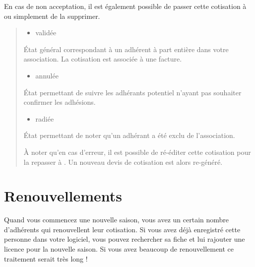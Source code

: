 \documentclass[a4paper,10pt,oneside,french]{sphinxmanual}
\begin{document}
En cas de non acceptation, il est également possible de passer cette cotisation à  ou simplement de la supprimer.
\begin{quote}
\begin{itemize}
\item {} 
validée

\end{itemize}

État général correspondant à un adhérent à part entière dans votre association.
La cotisation est associée à une facture.
\begin{itemize}
\item {} 
annulée

\end{itemize}

État permettant de suivre les adhérants potentiel n’ayant pas souhaiter confirmer les adhésions.
\begin{itemize}
\item {} 
radiée

\end{itemize}

État permettant de noter qu’un adhérant a été exclu de l’association.

À noter qu’en cas d’erreur, il est possible de ré-éditer cette cotisation pour la repasser à .
Un nouveau devis de cotisation est alors re-généré.
\end{quote}


\section{Renouvellements}
\label{\detokenize{member/renew:renouvellements}}\label{\detokenize{member/renew::doc}}
Quand vous commencez une nouvelle saison, vous avez un certain nombre d’adhérents qui renouvellent leur cotisation. Si vous avez déjà enregistré cette personne dans votre logiciel, vous pouvez rechercher sa fiche et lui rajouter une licence pour la nouvelle saison.
Si vous avez beaucoup de renouvellement ce traitement serait très long !
\end{document}

